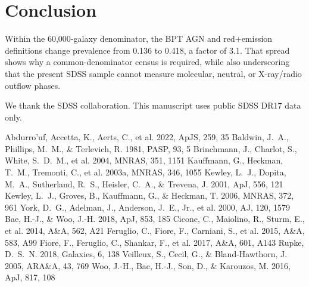 \documentclass[twocolumn]{aastex631}
\begin{document}
\section{Conclusion}\label{sec:conclusion}
Within the 60,000-galaxy denominator, the BPT AGN and red+emission definitions change prevalence from 0.136 to 0.418, a factor of 3.1. That spread shows why a common-denominator census is required, while also underscoring that the present SDSS sample cannot measure molecular, neutral, or X-ray/radio outflow phases.

\acknowledgments
We thank the SDSS collaboration. This manuscript uses public SDSS DR17 data only.


\begin{thebibliography}{}
 Abdurro'uf, Accetta, K., Aerts, C., et al. 2022, ApJS, 259, 35
 Baldwin, J.~A., Phillips, M.~M., \& Terlevich, R. 1981, PASP, 93, 5
 Brinchmann, J., Charlot, S., White, S.~D.~M., et al. 2004, MNRAS, 351, 1151
 Kauffmann, G., Heckman, T.~M., Tremonti, C., et al. 2003a, MNRAS, 346, 1055
 Kewley, L.~J., Dopita, M.~A., Sutherland, R.~S., Heisler, C.~A., \& Trevena, J. 2001, ApJ, 556, 121
 Kewley, L.~J., Groves, B., Kauffmann, G., \& Heckman, T. 2006, MNRAS, 372, 961
 York, D.~G., Adelman, J., Anderson, J.~E., Jr., et al. 2000, AJ, 120, 1579
 Bae, H.-J., \& Woo, J.-H. 2018, ApJ, 853, 185
 Cicone, C., Maiolino, R., Sturm, E., et al. 2014, A\&A, 562, A21
 Feruglio, C., Fiore, F., Carniani, S., et al. 2015, A\&A, 583, A99
 Fiore, F., Feruglio, C., Shankar, F., et al. 2017, A\&A, 601, A143
 Rupke, D.~S.~N. 2018, Galaxies, 6, 138
 Veilleux, S., Cecil, G., \& Bland-Hawthorn, J. 2005, ARA\&A, 43, 769
 Woo, J.-H., Bae, H.-J., Son, D., \& Karouzos, M. 2016, ApJ, 817, 108
\end{thebibliography}
\end{document}
